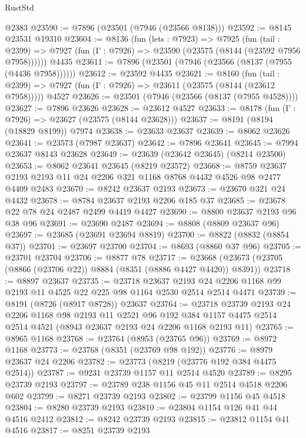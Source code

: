 \begin{lexlean}{RustStd}
\begin{coremodule}
    @2383
@23590 := @7896 (@23501 (@7946 (@23566 @8138)))
@23592 := @8145 @23531 @19310
@23604 := @8136
    (fun (lets : @7923) =>
    @7925
      (fun (tail : @2399) =>
      @7927 (fun (Γ : @7926) => @23590 (@23575 (@8144 (@23592 @7956 @7958))))))
    @4435
@23611 := @7896 (@23501 (@7946 (@23566 (@8137 (@7955 (@4436 @7958))))))
@23612 := @23592 @4435
@23621 := @8160
    (fun (tail : @2399) => @7927 (fun (Γ : @7926) => @23611 (@23575 (@8144 (@23612 @7958)))))
    @4527
@23626 := @23501 (@7946 (@23566 (@8137 (@7955 @4528))))
@23627 := @7896 @23626
@23628 := @23612 @4527
@23633 := @8178 (fun (Γ : @7926) => @23627 (@23575 (@8144 @23628)))
@23637 := @8191 (@8194 (@18829 @8199)) @7974
@23638 := @23633 @23637
@23639 := @8062 @23626
@23641 := @23573 (@7987 @23637)
@23642 := @7896 @23641
@23645 := @7994 @23637 @8143 @23628
@23649 := @23639 (@23642 @23645) (@8214 @23500)
@23653 := @8062 @23641 @23645 (@8219 @23572)
@23668 := @8759 @23637 @2193 @2193 @11 @24 @2206 @321 @1168 @8768 @4432 @4526 @98 @2477 @4409 @2483
@23670 := @8242 @23637 @2193
@23673 := @23670 @321 @24 @4432
@23678 := @8784 @23637 @2193 @2206 @185 @37
@23685 := @23678 @22 @78 @24 @2487 @2499 @4419 @4427
@23690 := @8800 @23637 @2193 @96 @38 @96
@23691 := @23690 @2487
@23694 := @8808 (@8809 @23637 @96)
@23697 := @23685 (@23691 @23694 @8819)
@23700 := @8822 (@8832 (@8854 @37))
@23701 := @23697 @23700
@23704 := @8693 (@8860 @37 @96)
@23705 := @23701 @23704
@23706 := @8877 @78
@23717 := @23668 (@23673 (@23705 (@8866 (@23706 @22)) @8884 (@8351 (@8886 @4427 @4420)) @8391))
@23718 := @8897 @23637
@23735 := @23718
    @23637
    @2193
    @24
    @2206
    @1168
    @99
    @2193
    @11
    @4525
    @22
    @225
    @98
    @1164
    @2530
    @2514
    @2514
    @4471
@23739 := @8191 (@8726 (@8917 @8728)) @23637
@23764 := @23718
    @23739
    @2193
    @24
    @2206
    @1168
    @98
    @2193
    @11
    @2521
    @96
    @192
    @384
    @1157
    @4475
    @2514
    @2514
    @4521
    (@8943 @23637 @2193 @24 @2206 @1168 @2193 @11)
@23765 := @8965 @1168
@23768 := @23764 (@8953 (@23765 @96))
@23769 := @8972 @1168
@23773 := @23768 (@8351 (@23769 @98 @192))
@23776 := @8979 @23637 @24 @2206
@23782 := @23773 (@8219 (@23776 @192 @384 @4475 @2514))
@23787 := @9231 @23739 @1157 @11 @2514 @4520
@23789 := @8295 @23739 @2193
@23797 := @23789 @238 @1156 @45 @11 @2514 @4518 @2206 @602
@23799 := @8271 @23739 @2193
@23802 := @23799 @1156 @45 @4518
@23804 := @8280 @23739 @2193
@23810 := @23804 @1154 @126 @41 @44 @4516 @2412
@23812 := @8242 @23739 @2193
@23815 := @23812 @1154 @41 @4516
@23817 := @8251 @23739 @2193

\end{coremodule}
\end{lexlean}

